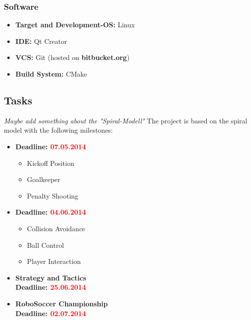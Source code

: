 \documentclass[12pt]{article}
\begin{document}
\subsubsection*{Software}
\begin{itemize}
	\item \textbf{Target and Development-OS:} Linux
	\item \textbf{IDE:} Qt Creator
	\item \textbf{VCS:} Git (hosted on \textbf{bitbucket.org})
	\item \textbf{Build System:} CMake
\end{itemize}

\subsection{Tasks}
\textit{Maybe add something about the "Spiral-Modell"}
The project is based on the spiral model with the following milestones:
\begin{itemize}
	\item \textbf{Deadline: \textcolor{red}{07.05.2014}}
	\begin{itemize}
		\item Kickoff Position
		\item Goalkeeper
		\item Penalty Shooting
	\end{itemize}
	
	\item \textbf{Deadline: \textcolor{red}{04.06.2014}}
	\begin{itemize}
		\item Collision Avoidance
		\item Ball Control
		\item Player Interaction
	\end{itemize}
	
	\item \textbf{Strategy and Tactics}\\
	\textbf{Deadline: \textcolor{red}{25.06.2014}}
	
	\item \textbf{RoboSoccer Championship}\\
	\textbf{Deadline: \textcolor{red}{02.07.2014}}
\end{itemize}
\end{document}
